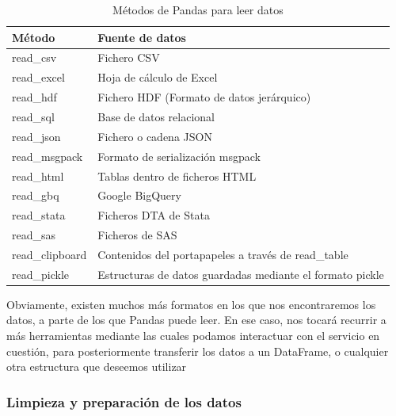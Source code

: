 \begin{table}[h!]
\centering
\caption{Métodos de Pandas para leer datos}
\label{pandas_readData}
\begin{tabular}{|l|l|}
\hline
\textbf{Método} & \textbf{Fuente de datos}                                  \\ \hline
read\_csv       & Fichero CSV                                               \\ \hline
read\_excel     & Hoja de cálculo de Excel                                  \\ \hline
read\_hdf       & Fichero HDF (Formato de datos jerárquico)                 \\ \hline
read\_sql       & Base de datos relacional                                  \\ \hline
read\_json      & Fichero o cadena JSON                                     \\ \hline
read\_msgpack   & Formato de serialización msgpack                          \\ \hline
read\_html      & Tablas dentro de ficheros HTML                            \\ \hline
read\_gbq       & Google BigQuery                                           \\ \hline
read\_stata     & Ficheros DTA de Stata                                     \\ \hline
read\_sas       & Ficheros de SAS                                           \\ \hline
read\_clipboard & Contenidos del portapapeles a través de read\_table       \\ \hline
read\_pickle    & Estructuras de datos guardadas mediante el formato pickle \\ \hline
\end{tabular}
\end{table}

Obviamente, existen muchos más formatos en los que nos encontraremos los datos,
a parte de los que Pandas puede leer. En ese caso, nos tocará recurrir a más
herramientas mediante las cuales podamos interactuar con el servicio en
cuestión, para posteriormente transferir los datos a un DataFrame, o cualquier
otra estructura que deseemos utilizar


\subsubsection{Limpieza y preparación de los datos}
\label{subsec:state_dataScience_workflow_1}

